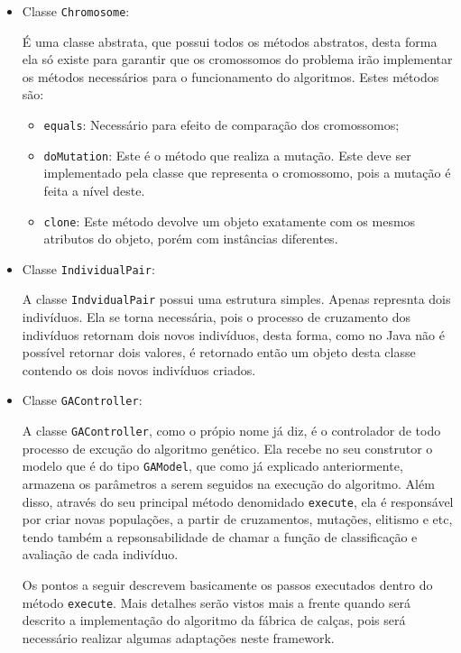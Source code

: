 \begin{itemize}
	\item Classe \texttt{Chromosome}:
	\par É uma classe abstrata, que possui todos os métodos abstratos, desta forma
	ela só existe para garantir que os cromossomos do problema irão implementar os
	métodos necessários para o funcionamento do algoritmos. Estes métodos são:
	
	\begin{itemize}
		
		\item \texttt{equals}: Necessário para efeito de comparação dos cromossomos;
		
		\item \texttt{doMutation}: Este é o método que realiza a mutação. Este deve
		ser implementado pela classe que representa o cromossomo, pois a
		mutação é feita a nível deste.
		
		\item \texttt{clone}: Este método devolve um objeto exatamente com os mesmos
		atributos do objeto, porém com instâncias diferentes.
		
	\end{itemize}
	
	
	\item Classe \texttt{IndividualPair}:
	\par A classe \texttt{IndvidualPair} possui uma estrutura simples. Apenas
	represnta dois indivíduos. Ela se torna necessária, pois o processo de
	cruzamento dos indivíduos retornam dois novos indivíduos, desta forma, como 
	no Java não é possível retornar dois valores, é retornado então um objeto desta
	classe contendo os dois novos indivíduos criados. 
	
	
	\item Classe \texttt{GAController}:
	\par A classe \texttt{GAController}, como o própio nome já diz, é o
	controlador de todo processo de excução do algoritmo genético.
	Ela recebe no seu construtor o modelo que é do tipo \texttt{GAModel}, que como
	já explicado anteriormente, armazena os parâmetros a serem seguidos na
	execução do algoritmo. Além disso, através do seu principal método
	denomidado \texttt{execute}, ela é responsável por criar novas populações, a
	partir de cruzamentos, mutações, elitismo e etc, tendo também a
	repsonsabilidade de chamar a função de classificação e avaliação de cada indivíduo.
	
	\par Os pontos a seguir descrevem basicamente os passos executados dentro do
	método \texttt{execute}. Mais detalhes serão vistos mais a frente quando será
	descrito a implementação do algoritmo da fábrica de calças, pois será necessário 
	realizar algumas adaptações neste framework.
	

\end{itemize}
